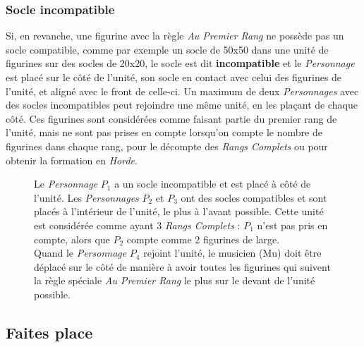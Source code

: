 \subsubsection*{Socle incompatible}
Si, en revanche, une figurine avec la règle \emph{Au Premier Rang} ne possède pas un socle compatible, comme par exemple un socle de 50x50{\milli\meter} dans une unité de figurines sur des socles de 20x20{\milli\meter}, le socle est dit \textbf{incompatible} et le \emph{Personnage} est placé sur le côté de l'unité, son socle en contact avec celui des figurines de l'unité, et aligné avec le front de celle-ci. Un maximum de deux \emph{Personnages} avec des socles incompatibles peut rejoindre une même unité, en les plaçant de chaque côté. Ces figurines sont considérées comme faisant partie du premier rang de l'unité, mais ne sont pas prises en compte lorsqu'on compte le nombre de figurines dans chaque rang, pour le décompte des \emph{Rangs Complets} ou pour obtenir la formation en \emph{Horde}.

\begin{figure}[!htbp]
\centering
\def\svgwidth{12cm}

\caption{Le \emph{Personnage} $ P_{1} $ a un socle incompatible et est placé à côté de l'unité. Les \emph{Personnages} $ P_{2} $ et $ P_{3} $ ont des socles compatibles et sont placés à l'intérieur de l'unité, le plus à l'avant possible. Cette unité est considérée comme ayant 3 \emph{Rangs Complets} : $ P_{1} $ n'est pas pris en compte, alors que $ P_{2} $ compte comme 2 figurines de large. \\
Quand le \emph{Personnage} $ P_{4} $ rejoint l'unité, le musicien (Mu) doit être déplacé sur le côté de manière à avoir toutes les figurines qui suivent la règle spéciale \emph{Au Premier Rang} le plus sur le devant de l'unité possible.}
\label{figure/au_premier_rang}
\end{figure}

\subsection{Faites place}



